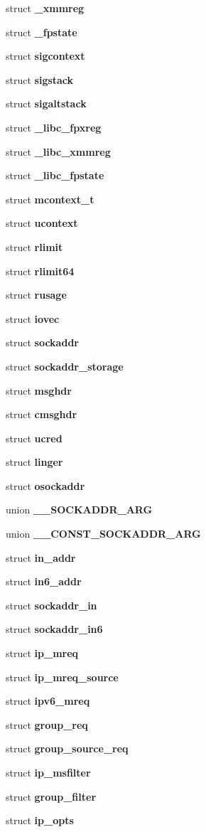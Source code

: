 \begin{DoxyCompactItemize}
\item 
struct {\bf \_\-xmmreg}
\item 
struct {\bf \_\-fpstate}
\item 
struct {\bf sigcontext}
\item 
struct {\bf sigstack}
\item 
struct {\bf sigaltstack}
\item 
struct {\bf \_\-libc\_\-fpxreg}
\item 
struct {\bf \_\-libc\_\-xmmreg}
\item 
struct {\bf \_\-libc\_\-fpstate}
\item 
struct {\bf mcontext\_\-t}
\item 
struct {\bf ucontext}
\item 
struct {\bf rlimit}
\item 
struct {\bf rlimit64}
\item 
struct {\bf rusage}
\item 
struct {\bf iovec}
\item 
struct {\bf sockaddr}
\item 
struct {\bf sockaddr\_\-storage}
\item 
struct {\bf msghdr}
\item 
struct {\bf cmsghdr}
\item 
struct {\bf ucred}
\item 
struct {\bf linger}
\item 
struct {\bf osockaddr}
\item 
union {\bf \_\-\_\-SOCKADDR\_\-ARG}
\item 
union {\bf \_\-\_\-CONST\_\-SOCKADDR\_\-ARG}
\item 
struct {\bf in\_\-addr}
\item 
struct {\bf in6\_\-addr}
\item 
struct {\bf sockaddr\_\-in}
\item 
struct {\bf sockaddr\_\-in6}
\item 
struct {\bf ip\_\-mreq}
\item 
struct {\bf ip\_\-mreq\_\-source}
\item 
struct {\bf ipv6\_\-mreq}
\item 
struct {\bf group\_\-req}
\item 
struct {\bf group\_\-source\_\-req}
\item 
struct {\bf ip\_\-msfilter}
\item 
struct {\bf group\_\-filter}
\item 
struct {\bf ip\_\-opts}
\item 

\end{DoxyCompactItemize}
